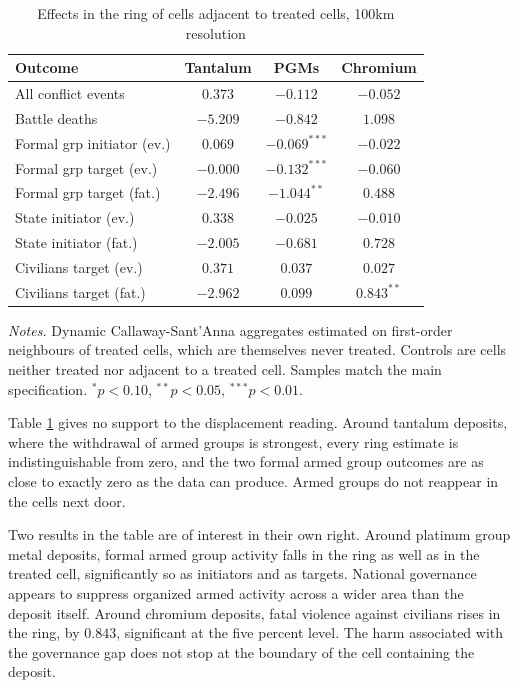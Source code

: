 \documentclass[11pt]{article}
\begin{document}
\begin{table}[H]
\centering
\footnotesize
\caption{Effects in the ring of cells adjacent to treated cells, 100km resolution}
\label{tab:spillover}
\begin{tabular}{lccc}
\toprule
\textbf{Outcome} & \textbf{Tantalum} & \textbf{PGMs} & \textbf{Chromium} \\
\midrule
All conflict events            & $0.373$   & $-0.112$        & $-0.052$ \\
Battle deaths                  & $-5.209$  & $-0.842$        & $1.098$ \\
Formal grp initiator (ev.)     & $0.069$   & $-0.069^{***}$  & $-0.022$ \\
Formal grp target (ev.)        & $-0.000$  & $-0.132^{***}$  & $-0.060$ \\
Formal grp target (fat.)       & $-2.496$  & $-1.044^{**}$   & $0.488$ \\
State initiator (ev.)          & $0.338$   & $-0.025$        & $-0.010$ \\
State initiator (fat.)         & $-2.005$  & $-0.681$        & $0.728$ \\
Civilians target (ev.)         & $0.371$   & $0.037$         & $0.027$ \\
Civilians target (fat.)        & $-2.962$  & $0.099$         & $0.843^{**}$ \\
\bottomrule
\end{tabular}
\begin{minipage}{0.86\textwidth}\vspace{4pt}\scriptsize \textit{Notes.} Dynamic Callaway-Sant'Anna aggregates estimated on first-order neighbours of treated cells, which are themselves never treated. Controls are cells neither treated nor adjacent to a treated cell. Samples match the main specification. $^{*}p<0.10$, $^{**}p<0.05$, $^{***}p<0.01$.\end{minipage}
\end{table}

Table \ref{tab:spillover} gives no support to the displacement reading. Around tantalum deposits, where the withdrawal of armed groups is strongest, every ring estimate is indistinguishable from zero, and the two formal armed group outcomes are as close to exactly zero as the data can produce. Armed groups do not reappear in the cells next door.

Two results in the table are of interest in their own right. Around platinum group metal deposits, formal armed group activity falls in the ring as well as in the treated cell, significantly so as initiators and as targets. National governance appears to suppress organized armed activity across a wider area than the deposit itself. Around chromium deposits, fatal violence against civilians rises in the ring, by $0.843$, significant at the five percent level. The harm associated with the governance gap does not stop at the boundary of the cell containing the deposit.
\end{document}
